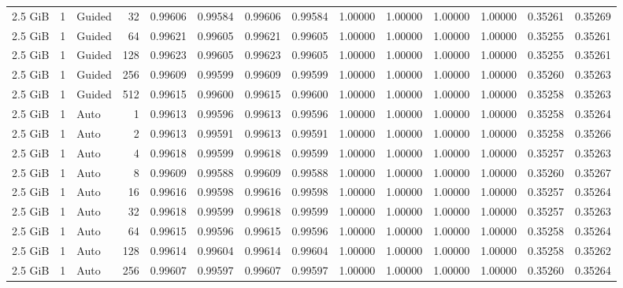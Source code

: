 \begin{table}[H]
\begin{adjustbox}{width=\textwidth, keepaspectratio}
\begin{tabular}{rrlrrrrrrrrrrr}
                    2.5 GiB & 1 & Guided & 32 & 0.99606 & 0.99584 & 0.99606 & 0.99584 & 1.00000 & 1.00000 & 1.00000 & 1.00000 & 0.35261 & 0.35269 \\
                    2.5 GiB & 1 & Guided & 64 & 0.99621 & 0.99605 & 0.99621 & 0.99605 & 1.00000 & 1.00000 & 1.00000 & 1.00000 & 0.35255 & 0.35261 \\
                    2.5 GiB & 1 & Guided & 128 & 0.99623 & 0.99605 & 0.99623 & 0.99605 & 1.00000 & 1.00000 & 1.00000 & 1.00000 & 0.35255 & 0.35261 \\
                    2.5 GiB & 1 & Guided & 256 & 0.99609 & 0.99599 & 0.99609 & 0.99599 & 1.00000 & 1.00000 & 1.00000 & 1.00000 & 0.35260 & 0.35263 \\
                    2.5 GiB & 1 & Guided & 512 & 0.99615 & 0.99600 & 0.99615 & 0.99600 & 1.00000 & 1.00000 & 1.00000 & 1.00000 & 0.35258 & 0.35263 \\
                    2.5 GiB & 1 & Auto & 1 & 0.99613 & 0.99596 & 0.99613 & 0.99596 & 1.00000 & 1.00000 & 1.00000 & 1.00000 & 0.35258 & 0.35264 \\
                    2.5 GiB & 1 & Auto & 2 & 0.99613 & 0.99591 & 0.99613 & 0.99591 & 1.00000 & 1.00000 & 1.00000 & 1.00000 & 0.35258 & 0.35266 \\
                    2.5 GiB & 1 & Auto & 4 & 0.99618 & 0.99599 & 0.99618 & 0.99599 & 1.00000 & 1.00000 & 1.00000 & 1.00000 & 0.35257 & 0.35263 \\
                    2.5 GiB & 1 & Auto & 8 & 0.99609 & 0.99588 & 0.99609 & 0.99588 & 1.00000 & 1.00000 & 1.00000 & 1.00000 & 0.35260 & 0.35267 \\
                    2.5 GiB & 1 & Auto & 16 & 0.99616 & 0.99598 & 0.99616 & 0.99598 & 1.00000 & 1.00000 & 1.00000 & 1.00000 & 0.35257 & 0.35264 \\
                    2.5 GiB & 1 & Auto & 32 & 0.99618 & 0.99599 & 0.99618 & 0.99599 & 1.00000 & 1.00000 & 1.00000 & 1.00000 & 0.35257 & 0.35263 \\
                    2.5 GiB & 1 & Auto & 64 & 0.99615 & 0.99596 & 0.99615 & 0.99596 & 1.00000 & 1.00000 & 1.00000 & 1.00000 & 0.35258 & 0.35264 \\
                    2.5 GiB & 1 & Auto & 128 & 0.99614 & 0.99604 & 0.99614 & 0.99604 & 1.00000 & 1.00000 & 1.00000 & 1.00000 & 0.35258 & 0.35262 \\
                    2.5 GiB & 1 & Auto & 256 & 0.99607 & 0.99597 & 0.99607 & 0.99597 & 1.00000 & 1.00000 & 1.00000 & 1.00000 & 0.35260 & 0.35264 \\

\end{tabular}
\end{adjustbox}
\end{table}
